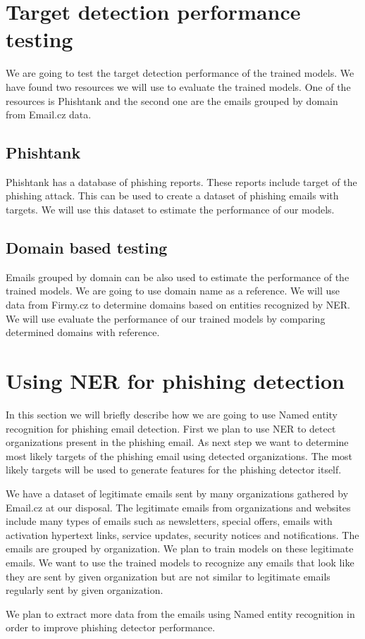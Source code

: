 \documentclass[thesis=B,english]{FITthesis}[2012/10/20]
\begin{document}
\section{Target detection performance testing}
We are going to test the target detection performance of the trained models. We have found two resources we will use to evaluate the trained models. One of the resources is Phishtank and the second one are the emails grouped by domain from Email.cz data.
\subsection{Phishtank}
\par Phishtank has a database of phishing reports. These reports include target of the phishing attack. This can be used to create a dataset of phishing emails with targets. We will use this dataset to estimate the performance of our models.
\subsection{Domain based testing}
\par Emails grouped by domain can be also used to estimate the performance of the trained models. We are going to use domain name as a reference. We will use data from Firmy.cz to determine domains based on entities recognized by NER. We will use evaluate the performance of our trained models by comparing determined domains with reference.

\section{Using NER for phishing detection}
In this section we will briefly describe how we are going to use Named entity recognition for phishing email detection. First we plan to use NER to detect organizations present in the phishing email. As next step we want to determine most likely targets of the phishing email using detected organizations. The most likely targets will be used to generate features for the phishing detector itself.
\par We have a dataset of legitimate emails sent by many organizations gathered by Email.cz at our disposal. The legitimate emails from organizations and websites include many types of emails such as newsletters, special offers, emails with activation hypertext links, service updates, security notices and notifications. The emails are grouped by organization. We plan to train models on these legitimate emails. We want to use the trained models to recognize any emails that look like they are sent by given organization but are not similar to legitimate emails regularly sent by given organization.
\par We plan to extract more data from the emails using Named entity recognition in order to improve phishing detector performance.
\end{document}
